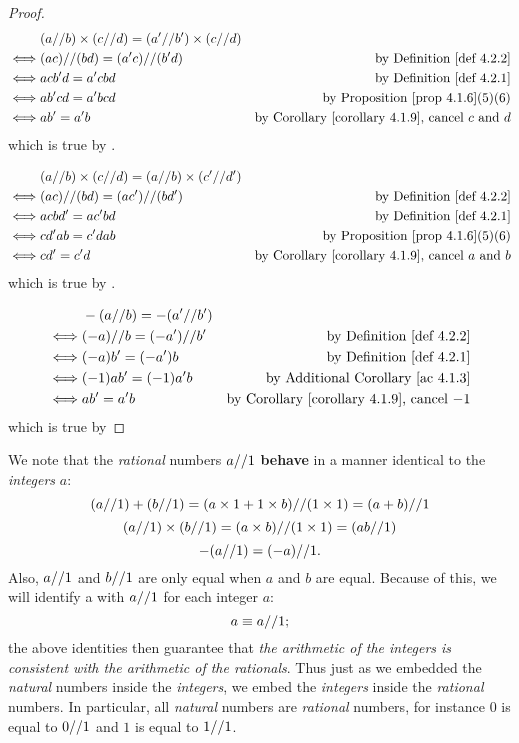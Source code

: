 \begin{proof}
\begin{align*}
         & (a \D b) \X (c \D d) = (a' \D b') \X (c \D d) \\
    \iff & (ac) \D (bd) = (a'c) \D (b'd) & \text{by \DEF{4.2.2}} \\
    \iff & acb'd = a'cbd & \text{by \DEF{4.2.1}} \\
    \iff & ab'cd = a'bcd & \text{by \PROP{4.1.6}(5)(6)} \\
    \iff & ab' = a'b & \text{by \CORO{4.1.9}, cancel \(c\) and \(d\)}
\end{align*}
which is true by .

\begin{align*}
         & (a \D b) \X (c \D d) = (a \D b) \X (c' \D d') \\
    \iff & (ac) \D (bd) = (ac') \D (bd') & \text{by \DEF{4.2.2}} \\
    \iff & acbd' = ac'bd & \text{by \DEF{4.2.1}} \\
    \iff & cd'ab = c'dab & \text{by \PROP{4.1.6}(5)(6)} \\
    \iff & cd' = c'd & \text{by \CORO{4.1.9}, cancel \(a\) and \(b\)}
\end{align*}
which is true by .

\begin{align*}
         & -(a \D b) = -(a' \D b') \\
    \iff & (-a) \D b = (-a') \D b' & \text{by \DEF{4.2.2}} \\
    \iff & (-a)b' = (-a')b & \text{by \DEF{4.2.1}} \\
    \iff & (-1)ab' = (-1)a'b & \text{by \AC{4.1.3}} \\
    \iff & ab' = a'b & \text{by \CORO{4.1.9}, cancel \(-1\)}
\end{align*}
which is true by 
\end{proof}

We note that the \emph{rational} numbers \(a \text{//} 1\) \textbf{behave} in a manner identical to the \emph{integers} \(a\):
\[
    (a \text{//} 1) + (b \text{//} 1) = (a \times 1 + 1 \times b) \text{//} (1 \times 1) = (a + b) \text{//} 1
\]
\[
    (a \text{//} 1) \times (b \text{//} 1) = (a \times b) \text{//} (1 \times 1) = (ab \text{//} 1)
\]
\[
    -(a \text{//} 1) = (-a) \text{//} 1.
\]
Also, \(a \text{//} 1\) and \(b \text{//} 1\) are only equal when \(a\) and \(b\) are equal.
Because of this, we will identify a with \(a \text{//} 1\) for each integer \(a\):
\[
    a \equiv a \text{//} 1;
\]
the above identities then guarantee that \emph{the arithmetic of the integers is consistent with the arithmetic of the rationals}.
Thus just as we embedded the \emph{natural} numbers inside the \emph{integers}, we embed the \emph{integers} inside the \emph{rational} numbers.
In particular, all \emph{natural} numbers are \emph{rational} numbers, for instance \(0\) is equal to \(0 \text{//} 1\) and \(1\) is equal to \(1 \text{//} 1\).

